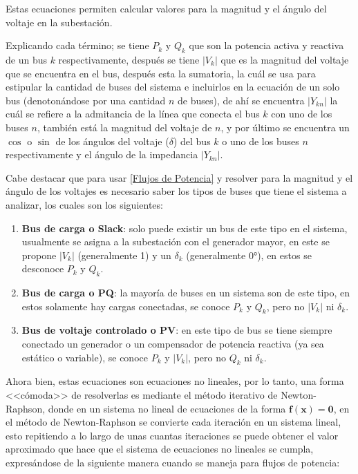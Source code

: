 \documentclass[11pt, letterpaper]{article}
\begin{document}
Estas ecuaciones permiten calcular valores para la magnitud y el ángulo del voltaje en la subestación.

Explicando cada término; se tiene $ P_k $ y $ Q_k $ que son la potencia activa y reactiva de un bus $ k $ respectivamente, después se tiene $ |V_k| $ que es la magnitud
del voltaje que se encuentra en el bus, después esta la sumatoria, la cuál se usa para estipular la cantidad de buses del sistema e incluirlos en la ecuación de un solo bus
(denotonándose por una cantidad $ n $ de buses), de ahí se encuentra $ |Y_{kn}| $ la cuál se refiere a la admitancia de la línea que conecta el bus $ k $ con uno de los buses $ n $,
también está la magnitud del voltaje de $ n $, y por último se encuentra un $ \cos $ o $ \sin $ de los ángulos del voltaje ($ \delta $) del bus $ k $ o uno de los buses $ n $ respectivamente
y el ángulo de la impedancia $ |Y_{kn}| $.

Cabe destacar que para usar \eqref{Flujos de Potencia} y resolver para la magnitud y el ángulo de los voltajes es necesario saber los tipos de buses que tiene el sistema a analizar, los cuales son los siguientes:

\begin{enumerate}
    \item \textbf{Bus de carga o Slack}: solo puede existir un bus de este tipo en el sistema, usualmente se asigna a la subestación con el generador mayor, en este se propone $ |V_k| $ (generalmente \qty{1}{\pu}) y un $ \delta_k $
    (generalmente \ang{0}), en estos se desconoce $ P_k $ y $ Q_k $.
    \item \textbf{Bus de carga o PQ}: la mayoría de buses en un sistema son de este tipo, en estos solamente hay cargas conectadas, se conoce $ P_k $ y $ Q_k $, pero no $ |V_k| $ ni $ \delta_k $.
    \item \textbf{Bus de voltaje controlado o PV}: en este tipo de bus se tiene siempre conectado un generador o un compensador de potencia reactiva (ya sea estático o variable), se conoce $ P_k $ y $ |V_k| $, pero no $ Q_k $ ni 
    $ \delta_k $.
\end{enumerate}

Ahora bien, estas ecuaciones son ecuaciones no lineales, por lo tanto, una forma <<cómoda>> de resolverlas es mediante el método iterativo
de Newton-Raphson, donde en un sistema no lineal de ecuaciones de la forma $ \bm{f}(\bm{x}) = \bm{0} $, en el método de Newton-Raphson 
se convierte cada iteración en un sistema lineal, esto repitiendo a lo largo de unas cuantas iteraciones se puede obtener el valor aproximado que hace que 
el sistema de ecuaciones no lineales se cumpla, expresándose de la siguiente manera cuando se maneja para flujos de potencia:
\end{document}
